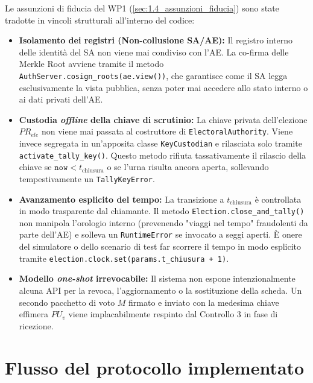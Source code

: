 Le assunzioni di fiducia del WP1 (\ref{sec:1.4_assunzioni_fiducia}) sono state tradotte
in vincoli strutturali all'interno del codice:

\begin{itemize}
  \item \textbf{Isolamento dei registri (Non-collusione SA/AE):} Il registro interno delle identità del SA non viene mai condiviso con l'AE. La co-firma delle Merkle Root avviene tramite il metodo \texttt{AuthServer.}\allowbreak\texttt{cosign\_roots(ae.view())}, che garantisce come il SA legga esclusivamente la vista pubblica, senza poter mai accedere allo stato interno o ai dati privati dell'AE.
  
  \item \textbf{Custodia \emph{offline} della chiave di scrutinio:} La chiave privata dell'elezione $PR_{ele}$ non viene mai passata al costruttore di \texttt{ElectoralAuthority}. Viene invece segregata in un'apposita classe \texttt{KeyCustodian} e rilasciata solo tramite \texttt{activate\_tally\_key()}. Questo metodo rifiuta tassativamente il rilascio della chiave se $\texttt{now} < t_{\text{chiusura}}$ o se l'urna risulta ancora aperta, sollevando tempestivamente un \texttt{TallyKeyError}.
  
  \item \textbf{Avanzamento esplicito del tempo:} La transizione a $t_{\text{chiusura}}$ è controllata in modo trasparente dal chiamante. Il metodo \texttt{Election.close\_and\_tally()} non manipola l'orologio interno (prevenendo "viaggi nel tempo" fraudolenti da parte dell'AE) e solleva un \texttt{RuntimeError} se invocato a seggi aperti. È onere del simulatore o dello scenario di test far scorrere il tempo in modo esplicito tramite \texttt{election.clock.set(params.t\_chiusura + 1)}.
  
  \item \textbf{Modello \emph{one-shot} irrevocabile:} Il sistema non espone intenzionalmente alcuna API per la revoca, l'aggiornamento o la sostituzione della scheda. Un secondo pacchetto di voto $M$ firmato e inviato con la medesima chiave effimera $PU_v$ viene implacabilmente respinto dal Controllo 3 in fase di ricezione.
\end{itemize}


\section{Flusso del protocollo implementato}
\label{sec:wp4_flusso}

